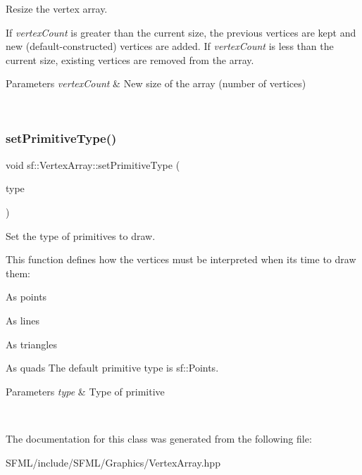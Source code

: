 Resize the vertex array. 

If {\itshape vertex\+Count} is greater than the current size, the previous vertices are kept and new (default-\/constructed) vertices are added. If {\itshape vertex\+Count} is less than the current size, existing vertices are removed from the array.


\begin{DoxyParams}{Parameters}
{\em vertex\+Count} & New size of the array (number of vertices) \begin{DoxyVerb}\end{DoxyVerb}
 \\
\hline
\end{DoxyParams}
\mbox{\label{classsf_1_1_vertex_array_aa38c10707c28a97f4627ae8b2f3ad969}} 
\subsubsection{\texorpdfstring{setPrimitiveType()}{setPrimitiveType()}}
{\footnotesize\ttfamily void sf\+::\+Vertex\+Array\+::set\+Primitive\+Type (\begin{DoxyParamCaption}\item[{\mbox{\hyperlink{group__graphics_ga5ee56ac1339984909610713096283b1b}{Primitive\+Type}}}]{type }\end{DoxyParamCaption})}



Set the type of primitives to draw. 

This function defines how the vertices must be interpreted when it\textquotesingle{}s time to draw them\+: \begin{DoxyItemize}
\item As points \item As lines \item As triangles \item As quads The default primitive type is sf\+::\+Points.\end{DoxyItemize}

\begin{DoxyParams}{Parameters}
{\em type} & Type of primitive \begin{DoxyVerb}\end{DoxyVerb}
 \\
\hline
\end{DoxyParams}


The documentation for this class was generated from the following file\+:\begin{DoxyCompactItemize}
\item 
S\+F\+M\+L/include/\+S\+F\+M\+L/\+Graphics/Vertex\+Array.\+hpp\end{DoxyCompactItemize}

